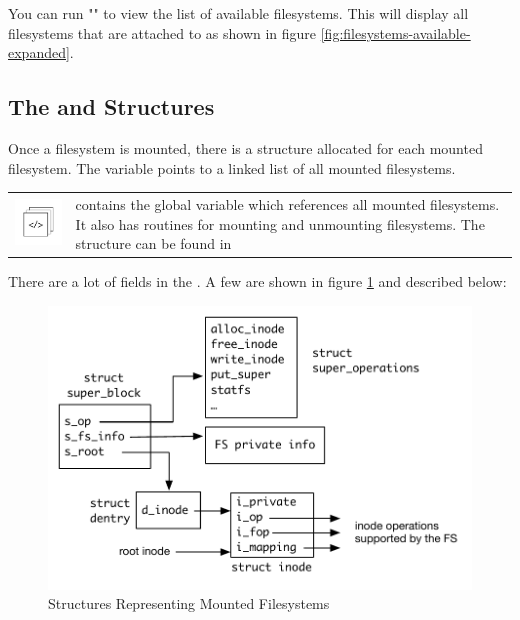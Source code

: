 \noindent
You can run "" to view the list of available filesystems. This will display all filesystems that are attached to  as shown in figure \ref{fig:filesystems-available-expanded}. 


\subsection{The  and  Structures}\label{superblock}

Once a filesystem is mounted, there is a  structure allocated for each mounted filesystem. The  variable points to a linked list of all mounted filesystems.

\begin{table}[h]
\begin{tabular}{ll}
\parbox[l]{0.6in}{\includegraphics[scale=0.8]{figures/src-xref.pdf}} & \parbox[l]{4in}{\small{ contains the  global variable which references all mounted filesystems. It also has routines for mounting and unmounting filesystems. The  structure can be found in }}
\end{tabular}
\end{table}

\noindent
There are a lot of fields in the . A few are shown in figure \ref{fig:mount-structs} and described below:

\begin{figure}
	\includegraphics[scale=0.6]{figures/mount-structs.pdf}
	\centering
	\caption{Structures Representing Mounted Filesystems}
	\label{fig:mount-structs}
\end{figure}

